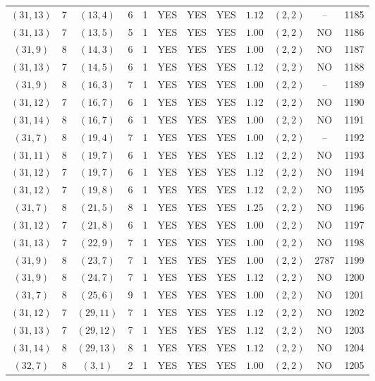 \begin{longtable}{|c|c|c|c|c|c|c|c|c|c|c|c|}
$(31,13)$ & 7 & $(13,4)$ & 6 & 1 & YES & YES & YES & $1.12$ & $(2,2)$ & -- & 1185\\
$(31,13)$ & 7 & $(13,5)$ & 5 & 1 & YES & YES & YES & $1.00$ & $(2,2)$ & NO & 1186\\
$(31,9)$ & 8 & $(14,3)$ & 6 & 1 & YES & YES & YES & $1.00$ & $(2,2)$ & NO & 1187\\
$(31,13)$ & 7 & $(14,5)$ & 6 & 1 & YES & YES & YES & $1.12$ & $(2,2)$ & NO & 1188\\
$(31,9)$ & 8 & $(16,3)$ & 7 & 1 & YES & YES & YES & $1.00$ & $(2,2)$ & -- & 1189\\
$(31,12)$ & 7 & $(16,7)$ & 6 & 1 & YES & YES & YES & $1.12$ & $(2,2)$ & NO & 1190\\
$(31,14)$ & 8 & $(16,7)$ & 6 & 1 & YES & YES & YES & $1.00$ & $(2,2)$ & NO & 1191\\
$(31,7)$ & 8 & $(19,4)$ & 7 & 1 & YES & YES & YES & $1.00$ & $(2,2)$ & -- & 1192\\
$(31,11)$ & 8 & $(19,7)$ & 6 & 1 & YES & YES & YES & $1.12$ & $(2,2)$ & NO & 1193\\
$(31,12)$ & 7 & $(19,7)$ & 6 & 1 & YES & YES & YES & $1.12$ & $(2,2)$ & NO & 1194\\
$(31,12)$ & 7 & $(19,8)$ & 6 & 1 & YES & YES & YES & $1.12$ & $(2,2)$ & NO & 1195\\
$(31,7)$ & 8 & $(21,5)$ & 8 & 1 & YES & YES & YES & $1.25$ & $(2,2)$ & NO & 1196\\
$(31,12)$ & 7 & $(21,8)$ & 6 & 1 & YES & YES & YES & $1.00$ & $(2,2)$ & NO & 1197\\
$(31,13)$ & 7 & $(22,9)$ & 7 & 1 & YES & YES & YES & $1.00$ & $(2,2)$ & NO & 1198\\
$(31,9)$ & 8 & $(23,7)$ & 7 & 1 & YES & YES & YES & $1.00$ & $(2,2)$ & 2787 & 1199\\
$(31,9)$ & 8 & $(24,7)$ & 7 & 1 & YES & YES & YES & $1.12$ & $(2,2)$ & NO & 1200\\
$(31,7)$ & 8 & $(25,6)$ & 9 & 1 & YES & YES & YES & $1.00$ & $(2,2)$ & NO & 1201\\
$(31,12)$ & 7 & $(29,11)$ & 7 & 1 & YES & YES & YES & $1.12$ & $(2,2)$ & NO & 1202\\
$(31,13)$ & 7 & $(29,12)$ & 7 & 1 & YES & YES & YES & $1.12$ & $(2,2)$ & NO & 1203\\
$(31,14)$ & 8 & $(29,13)$ & 8 & 1 & YES & YES & YES & $1.12$ & $(2,2)$ & NO & 1204\\
$(32,7)$ & 8 & $(3,1)$ & 2 & 1 & YES & YES & YES & $1.00$ & $(2,2)$ & NO & 1205\\

\end{longtable}

